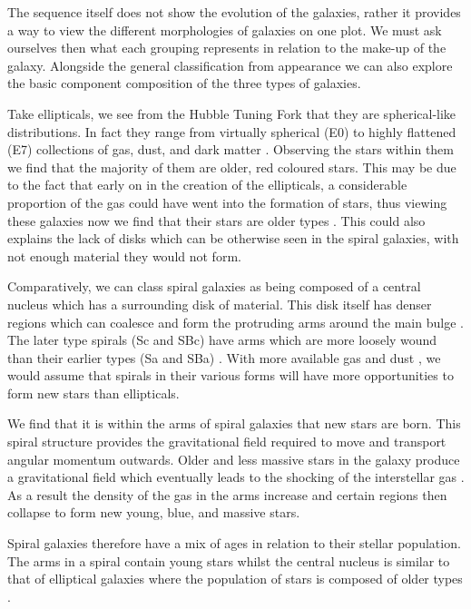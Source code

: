 \documentclass[12pt, twocolumn]{revtex4}    %
\begin{document}
The sequence itself does not show the evolution of the galaxies, rather it provides a way to view the different morphologies of galaxies on one plot. We must ask ourselves then what each grouping represents in relation to the make-up of the galaxy. Alongside the general classification from appearance we can also explore the basic component composition of the three types of galaxies. 

Take ellipticals, we see from the Hubble Tuning Fork that they are spherical-like distributions. In fact they range from virtually spherical (E0) to highly flattened (E7) collections of gas, dust, and dark matter \cite{moore_databook}. Observing the stars within them we find that the majority of them are older, red coloured stars. This may be due to the fact that early on in the creation of the ellipticals, a considerable proportion of the gas could have went into the formation of stars, thus viewing these galaxies now we find that their stars are older types \cite{carroll_astro}. This could also explains the lack of disks which can be otherwise seen in the spiral galaxies, with not enough material they would not form.

Comparatively, we can class spiral galaxies as being composed of a central nucleus which has a surrounding disk of material. This disk itself has denser regions which can coalesce and form the protruding arms around the main bulge \cite{carroll_astro}. The later type spirals (Sc and SBc) have arms which are more loosely wound than their earlier types (Sa and SBa) \cite{moore_databook}. With more available gas and dust \cite{carroll_astro}, we would assume that spirals in their various forms will have more opportunities to form new stars than ellipticals. 

We find that it is within the arms of spiral galaxies that new stars are born. This spiral structure provides the gravitational field required to move and transport angular momentum outwards. Older and less massive stars in the galaxy produce a gravitational field which eventually leads to the shocking of the interstellar gas \cite{binney_galaxies}. As a result the density of the gas in the arms increase and certain regions then collapse to form new young, blue, and massive stars. 

Spiral galaxies therefore have a mix of ages in relation to their stellar population. The arms in a spiral contain young stars whilst the central nucleus is similar to that of elliptical galaxies where the population of stars is composed of older types \cite{carroll_astro, binney_galaxies}.
\end{document}
